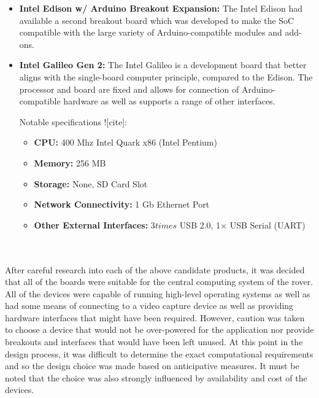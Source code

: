\begin{itemize}
        \item \textbf{Intel Edison w/ Arduino Breakout Expansion:}
          The Intel Edison had available a second breakout board which was developed to make the SoC compatible with the large variety of Arduino-compatible modules and add-ons.

        \item \textbf{Intel Galileo Gen 2:}
          The Intel Galileo is a development board that better aligns with the single-board computer principle, compared to the Edison. The processor and board are fixed and allows for connection of Arduino-compatible hardware as well as supports a range of other interfaces.
          
          Notable specifications ![cite]:
          \begin{itemize}
            \item \textbf{CPU:} 400 Mhz Intel Quark x86 (Intel Pentium)
            \item \textbf{Memory:} 256 MB
            \item \textbf{Storage:} None, SD Card Slot
            \item \textbf{Network Connectivity:} 1 Gb Ethernet Port
            \item \textbf{Other External Interfaces:} 3$times$ USB 2.0, 1$\times$ USB Serial (UART)
          \end{itemize}
      \end{itemize}
      
      \\\\
        After careful research into each of the above candidate products, it was decided that all of the boards were suitable for the central computing system of the rover. All of the devices were capable of running high-level operating systems as well as had some means of connecting to a video capture device as well as providing hardware interfaces that might have been required. However, caution was taken to choose a device that would not be over-powered for the application nor provide breakouts and interfaces that would have been left unused. At this point in the design process, it was difficult to determine the exact computational requirements and so the design choice was made based on anticipative measures. It must be noted that the choice was also strongly influenced by availability and cost of the devices.
        
